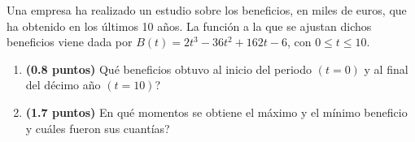 
Una empresa ha realizado un estudio sobre los beneficios, en miles de euros, que ha obtenido en los últimos 10 años. La función a la que se ajustan dichos beneficios viene dada por $B(t)=2t^3-36t^2+162t-6$, con $0\leq t\leq10$.
\begin{enumerate}[label=\alph*)]
\item \textbf{(0.8 puntos)} \textquestiondown{}Qué beneficios obtuvo al inicio del periodo $(t=0)$ y al final del décimo año $(t=10)$?
\item \textbf{(1.7 puntos)} \textquestiondown{}En qué momentos se obtiene el máximo y el mínimo beneficio y cuáles fueron sus cuantías?
\end{enumerate}
